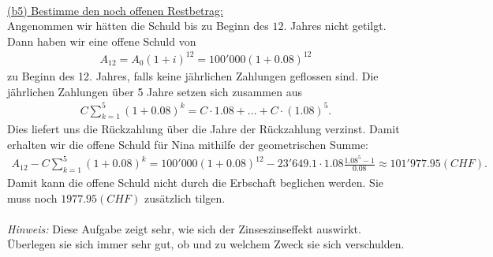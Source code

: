 \ \\
\underline{(b5) Bestimme den noch offenen Restbetrag:}\\
Angenommen wir hätten die Schuld bis zu Beginn des $ 12. $ Jahres nicht getilgt.
Dann haben wir eine offene Schuld von
\begin{align*}
A_{12} = A_0 (1+i)^{12} = 100'000(1+0.08)^{12}
\end{align*}
zu Beginn des 12. Jahres, falls keine jährlichen Zahlungen geflossen sind.
Die jährlichen Zahlungen über 5 Jahre setzen sich zusammen aus
\begin{align*}
C \sum \limits_{k=1}^5 (1+ 0.08)^k
= C \cdot 1.08+ ... + C\cdot (1.08)^5.
\end{align*}
Dies liefert uns die Rückzahlung über die Jahre der Rückzahlung verzinst.
Damit erhalten wir die offene Schuld für Nina mithilfe der geometrischen Summe:
\begin{align*}
A_{12} - C \sum \limits_{k=1}^5 (1+ 0.08)^k
=
100'000(1+ 0.08)^{12}- 23'649.1 \cdot 1.08 \frac{1.08^5 -1}{0.08}
\approx 101'977.95 (CHF).
\end{align*}
Damit kann die offene Schuld nicht durch die Erbschaft beglichen werden.
Sie muss noch $ 1977.95 (CHF) $ zusätzlich tilgen. \\
\\
\textit{Hinweis:} Diese Aufgabe zeigt sehr, wie sich der Zinseszinseffekt auswirkt.
Überlegen sie sich immer sehr gut, ob und zu welchem Zweck sie sich verschulden.
\newpage
